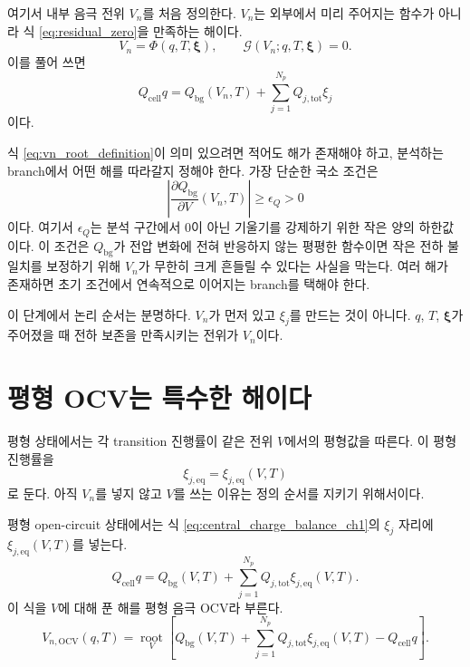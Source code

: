 \documentclass[11pt,a4paper]{article}
\newcommand{\cell}{\mathrm{cell}}
\newcommand{\bg}{\mathrm{bg}}
\newcommand{\tot}{\mathrm{tot}}
\newcommand{\eqs}{\mathrm{eq}}
\newcommand{\OCV}{\mathrm{OCV}}
\begin{document}
여기서 내부 음극 전위 \(V_n\)를 처음 정의한다. \(V_n\)는 외부에서 미리 주어지는 함수가 아니라 식 \eqref{eq:residual_zero}을 만족하는 해이다.
\begin{equation}
V_n=\Phi(q,T,\bm{\xi}),
\qquad
\mathcal{G}(V_n;q,T,\bm{\xi})=0.
\label{eq:vn_root_definition}
\end{equation}
이를 풀어 쓰면
\begin{equation}
Q_{\cell}q
=
Q_{\bg}(V_n,T)
+\sum_{j=1}^{N_p}Q_{j,\tot}\xi_j
\label{eq:central_charge_balance_ch1}
\end{equation}
이다.

식 \eqref{eq:vn_root_definition}이 의미 있으려면 적어도 해가 존재해야 하고, 분석하는 branch에서 어떤 해를 따라갈지 정해야 한다. 가장 단순한 국소 조건은
\begin{equation}
\left|
\frac{\partial Q_{\bg}}{\partial V}(V_n,T)
\right|
\ge \epsilon_Q>0
\label{eq:bg_slope_nonzero}
\end{equation}
이다. 여기서 \(\epsilon_Q\)는 분석 구간에서 0이 아닌 기울기를 강제하기 위한 작은 양의 하한값이다. 이 조건은 \(Q_{\bg}\)가 전압 변화에 전혀 반응하지 않는 평평한 함수이면 작은 전하 불일치를 보정하기 위해 \(V_n\)가 무한히 크게 흔들릴 수 있다는 사실을 막는다. 여러 해가 존재하면 초기 조건에서 연속적으로 이어지는 branch를 택해야 한다.

이 단계에서 논리 순서는 분명하다. \(V_n\)가 먼저 있고 \(\xi_j\)를 만드는 것이 아니다. \(q\), \(T\), \(\bm{\xi}\)가 주어졌을 때 전하 보존을 만족시키는 전위가 \(V_n\)이다.

\section{평형 OCV는 특수한 해이다}

평형 상태에서는 각 transition 진행률이 같은 전위 \(V\)에서의 평형값을 따른다. 이 평형 진행률을
\begin{equation}
\xi_{j,\eqs}=\xi_{j,\eqs}(V,T)
\label{eq:xi_eq_general}
\end{equation}
로 둔다. 아직 \(V_n\)를 넣지 않고 \(V\)를 쓰는 이유는 정의 순서를 지키기 위해서이다.

평형 open-circuit 상태에서는 식 \eqref{eq:central_charge_balance_ch1}의 \(\xi_j\) 자리에 \(\xi_{j,\eqs}(V,T)\)를 넣는다.
\begin{equation}
Q_{\cell}q
=
Q_{\bg}(V,T)
+\sum_{j=1}^{N_p}Q_{j,\tot}\xi_{j,\eqs}(V,T).
\label{eq:equilibrium_balance}
\end{equation}
이 식을 \(V\)에 대해 푼 해를 평형 음극 OCV라 부른다.
\begin{equation}
V_{n,\OCV}(q,T)
=
\operatorname*{root}_{V}
\left[
Q_{\bg}(V,T)
+\sum_{j=1}^{N_p}Q_{j,\tot}\xi_{j,\eqs}(V,T)
-Q_{\cell}q
\right].
\label{eq:ocv_as_root}
\end{equation}
\end{document}
